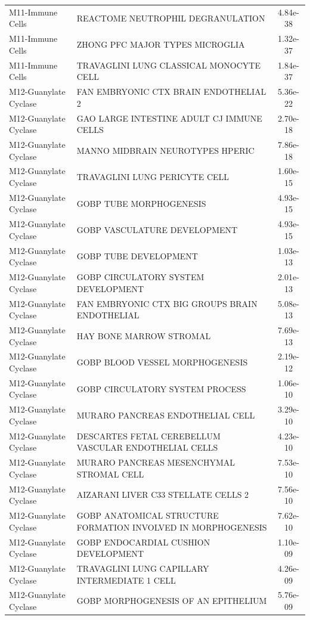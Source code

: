 \documentclass[
]{article}
\begin{document}
\begin{singlespace}
\begin{longtable}[t]{>{\raggedright\arraybackslash}p{1.4in}>{\raggedright\arraybackslash}p{4.5in}c}
M11-Immune Cells & REACTOME NEUTROPHIL DEGRANULATION & 4.84e-38\\
M11-Immune Cells & ZHONG PFC MAJOR TYPES MICROGLIA & 1.32e-37\\
M11-Immune Cells & TRAVAGLINI LUNG CLASSICAL MONOCYTE CELL & 1.84e-37\\
\addlinespace
M12-Guanylate Cyclase & FAN EMBRYONIC CTX BRAIN ENDOTHELIAL 2 & 5.36e-22\\
M12-Guanylate Cyclase & GAO LARGE INTESTINE ADULT CJ IMMUNE CELLS & 2.70e-18\\
M12-Guanylate Cyclase & MANNO MIDBRAIN NEUROTYPES HPERIC & 7.86e-18\\
M12-Guanylate Cyclase & TRAVAGLINI LUNG PERICYTE CELL & 1.60e-15\\
M12-Guanylate Cyclase & GOBP TUBE MORPHOGENESIS & 4.93e-15\\
\addlinespace
M12-Guanylate Cyclase & GOBP VASCULATURE DEVELOPMENT & 4.93e-15\\
M12-Guanylate Cyclase & GOBP TUBE DEVELOPMENT & 1.03e-13\\
M12-Guanylate Cyclase & GOBP CIRCULATORY SYSTEM DEVELOPMENT & 2.01e-13\\
M12-Guanylate Cyclase & FAN EMBRYONIC CTX BIG GROUPS BRAIN ENDOTHELIAL & 5.08e-13\\
M12-Guanylate Cyclase & HAY BONE MARROW STROMAL & 7.69e-13\\
\addlinespace
M12-Guanylate Cyclase & GOBP BLOOD VESSEL MORPHOGENESIS & 2.19e-12\\
M12-Guanylate Cyclase & GOBP CIRCULATORY SYSTEM PROCESS & 1.06e-10\\
M12-Guanylate Cyclase & MURARO PANCREAS ENDOTHELIAL CELL & 3.29e-10\\
M12-Guanylate Cyclase & DESCARTES FETAL CEREBELLUM VASCULAR ENDOTHELIAL CELLS & 4.23e-10\\
M12-Guanylate Cyclase & MURARO PANCREAS MESENCHYMAL STROMAL CELL & 7.53e-10\\
\addlinespace
M12-Guanylate Cyclase & AIZARANI LIVER C33 STELLATE CELLS 2 & 7.56e-10\\
M12-Guanylate Cyclase & GOBP ANATOMICAL STRUCTURE FORMATION INVOLVED IN MORPHOGENESIS & 7.62e-10\\
M12-Guanylate Cyclase & GOBP ENDOCARDIAL CUSHION DEVELOPMENT & 1.10e-09\\
M12-Guanylate Cyclase & TRAVAGLINI LUNG CAPILLARY INTERMEDIATE 1 CELL & 4.26e-09\\
M12-Guanylate Cyclase & GOBP MORPHOGENESIS OF AN EPITHELIUM & 5.76e-09\\

\end{longtable}
\end{singlespace}
\end{document}
